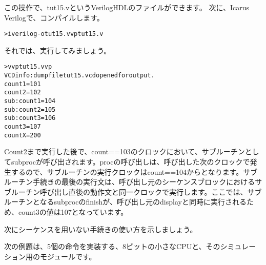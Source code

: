 この操作で、tut15.vというVerilogHDLのファイルができます。
次に、Icarus Verilogで、コンパイルします。

\begin{reviewcmd}
\begin{alltt}
\textgreater{} iverilog -o tut15.vvp tut15.v
\end{alltt}
\end{reviewcmd}

それでは、実行してみましょう。

\begin{reviewcmd}
\begin{alltt}
\textgreater{} vvp tut15.vvp
VCD info: dumpfile tut15.vcd opened for output.
count1 = 101
count2 = 102
sub:count1 = 104
sub:count2 = 105
sub:count3 = 106
count3 = 107
countX = 200
\end{alltt}
\end{reviewcmd}

Count2まで実行した後で、count==103のクロックにおいて、サブルーチンとしてsubprocが呼び出されます。procの呼び出しは、呼び出した次のクロックで発生するので、サブルーチンの実行クロックはcount==104からとなります。サブルーチン手続きの最後の実行文は、呼び出し元のシーケンスブロックにおけるサブルーチン呼び出し直後の動作文と同一クロックで実行します。ここでは、サブルーチンとなるsubprocのfinishが、呼び出し元の\textunderscore{}displayと同時に実行されるため、count3の値は107となっています。

次にシーケンスを用いない手続きの使い方を示しましょう。

次の例題は、5個の命令を実装する、8ビットの小さなCPUと、そのシミュレーション用のモジュールです。

